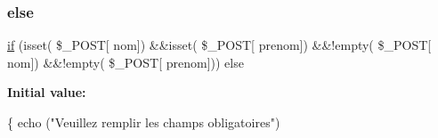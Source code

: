 \subsubsection{\texorpdfstring{else}{else}}
{\footnotesize\ttfamily \hyperlink{controleur_create_phone_8php_ae87c4f53487f23ee9a965a6691be21d2}{if} (isset( \$\+\_\+\+P\+O\+ST\mbox{[} \textquotesingle{}nom\textquotesingle{}\mbox{]}) \&\&isset( \$\+\_\+\+P\+O\+ST\mbox{[} \textquotesingle{}prenom\textquotesingle{}\mbox{]}) \&\&!empty( \$\+\_\+\+P\+O\+ST\mbox{[} \textquotesingle{}nom\textquotesingle{}\mbox{]}) \&\&!empty( \$\+\_\+\+P\+O\+ST\mbox{[} \textquotesingle{}prenom\textquotesingle{}\mbox{]})) else}

{\bfseries Initial value\+:}
\begin{DoxyCode}
\{
    echo (\textcolor{stringliteral}{"Veuillez remplir les champs obligatoires"})
\end{DoxyCode}
